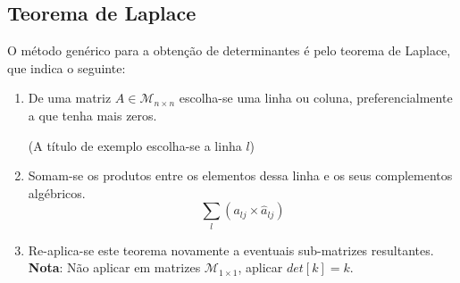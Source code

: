 \documentclass[]{report}
\begin{document}
\subsection{Teorema de Laplace}
O método genérico para a obtenção de determinantes é pelo teorema de Laplace, que indica o seguinte:
\begin{enumerate}
\item De uma matriz $A \in \mathcal{M}_{n \times n}$ escolha-se uma linha ou coluna, preferencialmente a que tenha mais zeros.
\begin{center}(A título de exemplo escolha-se a linha $l$)\end{center}
\item Somam-se os produtos entre os elementos dessa linha e os seus complementos algébricos.
$$\sum_l \left(a_{lj} \times \hat a_{lj}\right)$$
\item Re-aplica-se este teorema novamente a eventuais sub-matrizes resultantes.\\
\textbf{Nota}: Não aplicar em matrizes $\mathcal{M}_{1\times 1}$, aplicar $det [k] = k$.
\end{enumerate}
\end{document}
